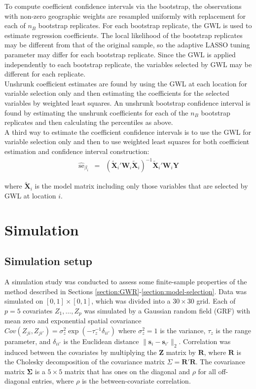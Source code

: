\documentclass[authoryear, review, 11pt]{elsarticle}
\begin{document}
	 	To compute coefficient confidence intervals via the bootstrap, the observations with non-zero geographic weights are resampled uniformly with replacement for each of $n_B$ bootstrap replicates. For each bootstrap replicate, the GWL is used to estimate regression coefficients. The local likelihood of the bootstrap replicates may be different from that of the original sample, so the adaptive LASSO tuning parameter may differ for each bootstrap replicate. Since the GWL is applied independently to each bootstrap replicate, the variables selected by GWL may be different for each replicate.\\
	
		 Unshrunk coefficient estimates are found by using the GWL at each location for variable selection only and then estimating the coefficients for the selected variables by weighted least squares. An unshrunk bootstrap confidence interval is found by estimating the unshrunk coefficients for each of the $n_B$ bootstrap replicates and then calculating the percentiles as above.\\
		 
		A third way to estimate the coefficient confidence intervals is to use the GWL for variable selection only and then to use weighted least squares for both coefficient estimation and confidence interval construction:
		\begin{eqnarray}
			\hat{\mbox{se}}_{\beta_i} &=& \left( \tilde{\bm{X}}_i'\bm{W}_i \tilde{\bm{X}}_i \right)^{-1}  \tilde{\bm{X}}_i'\bm{W}_i\bm{Y}
		\end{eqnarray}
	
		where $\tilde{\bm{X}}_i$ is the model matrix including only those variables that are selected by GWL at location $i$.



\section{Simulation}
	\subsection{Simulation setup}
	A simulation study was conducted to assess some finite-sample properties of the method described in Sections \ref{section:GWR}-\ref{section:model-selection}. Data was simulated on $[0,1] \times [0,1]$, which was divided into a $30 \times 30$ grid. Each of $p=5$ covariates $Z_1, \dots, Z_p$ was simulated by a Gaussian random field (GRF) with mean zero and exponential spatial covariance $Cov \left(Z_{ji}, Z_{ji'} \right) = \sigma_z^2 \exp{\left( -\tau_z^{-1} \delta_{ii'} \right)}$ where $\sigma_z^2=1$ is the variance, $\tau_z$ is the range parameter, and $\delta_{ii'}$ is the Euclidean distance $\|\bm{s}_i - \bm{s}_{i'}\|_2$. Correlation was induced between the covariates by multiplying the $\bm{Z}$ matrix by $\bm{R}$, where $\bm{R}$ is the Cholesky decomposition of the covariance matrix $\Sigma = \bm{R}'\bm{R}$. The covariance matrix $\bm{\Sigma}$ is a $5 \times 5$ matrix that has ones on the diagonal and $\rho$ for all off-diagonal entries, where $\rho$ is the between-covariate correlation.
		
\end{document}
